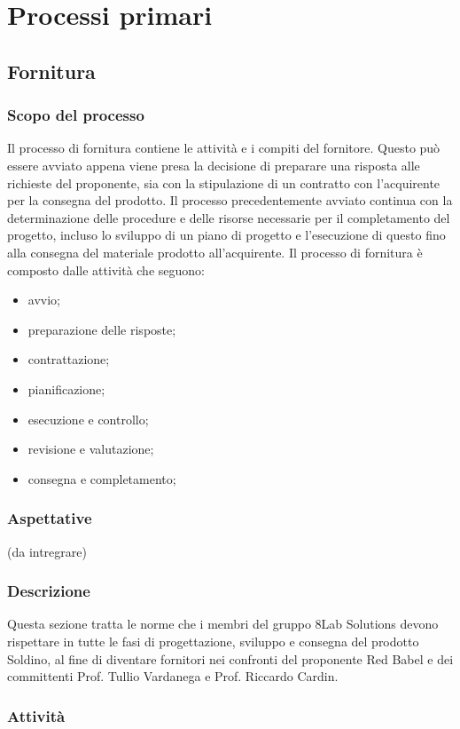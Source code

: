 \section{Processi primari}
\subsection{Fornitura}
\subsubsection{Scopo del processo}
Il processo di fornitura contiene le attività e i compiti del fornitore. Questo può essere avviato appena viene presa la decisione di preparare una risposta alle richieste del proponente, sia con la stipulazione di un contratto con l'acquirente per la consegna del prodotto.
Il processo precedentemente avviato continua con la determinazione delle procedure e delle risorse necessarie per il completamento del progetto, incluso lo sviluppo di un piano di progetto e l'esecuzione di questo fino alla consegna del materiale prodotto all'acquirente.
Il processo di fornitura è composto dalle attività che seguono:
\begin{itemize}
	\item avvio;
	\item preparazione delle risposte;
	\item contrattazione;
	\item pianificazione;
	\item esecuzione e controllo;
	\item revisione e valutazione;
	\item consegna e completamento;
\end{itemize}
\subsubsection{Aspettative}
(da intregrare)
\subsubsection{Descrizione}
Questa sezione tratta le norme che i membri del gruppo 8Lab Solutions devono rispettare in tutte le fasi di progettazione, sviluppo e consegna del prodotto Soldino, al fine di diventare fornitori nei confronti del proponente Red Babel e dei committenti Prof. Tullio Vardanega e Prof. Riccardo Cardin.
\subsubsection{Attività}
